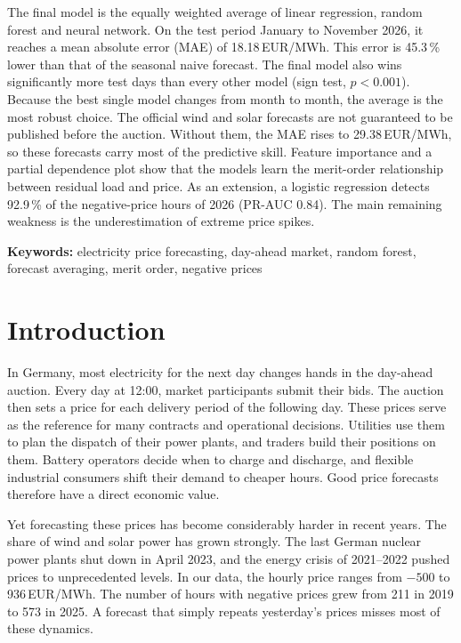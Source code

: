 \documentclass[12pt,oneside]{article}
\begin{document}
The final model is the equally weighted average of linear regression, random forest and neural network. On the test period January to November 2026, it reaches a mean absolute error (MAE) of 18.18\,EUR/MWh. This error is 45.3\,\% lower than that of the seasonal naive forecast. The final model also wins significantly more test days than every other model (sign test, $p < 0.001$). Because the best single model changes from month to month, the average is the most robust choice. The official wind and solar forecasts are not guaranteed to be published before the auction. Without them, the MAE rises to 29.38\,EUR/MWh, so these forecasts carry most of the predictive skill. Feature importance and a partial dependence plot show that the models learn the merit-order relationship between residual load and price. As an extension, a logistic regression detects 92.9\,\% of the negative-price hours of 2026 (PR-AUC 0.84). The main remaining weakness is the underestimation of extreme price spikes.

\textbf{Keywords:} electricity price forecasting, day-ahead market, random forest, forecast averaging, merit order, negative prices


\clearpage
{}
    \setcounter{page}{1}
\lhead{\nouppercase{\leftmark}}


\section{Introduction} \label{Introduction}

In Germany, most electricity for the next day changes hands in the day-ahead auction. Every day at 12:00, market participants submit their bids. The auction then sets a price for each delivery period of the following day. These prices serve as the reference for many contracts and operational decisions. Utilities use them to plan the dispatch of their power plants, and traders build their positions on them. Battery operators decide when to charge and discharge, and flexible industrial consumers shift their demand to cheaper hours. Good price forecasts therefore have a direct economic value.

Yet forecasting these prices has become considerably harder in recent years. The share of wind and solar power has grown strongly. The last German nuclear power plants shut down in April 2023, and the energy crisis of 2021--2022 pushed prices to unprecedented levels. In our data, the hourly price ranges from $-500$ to 936\,EUR/MWh. The number of hours with negative prices grew from 211 in 2019 to 573 in 2025. A forecast that simply repeats yesterday's prices misses most of these dynamics.
\end{document}
